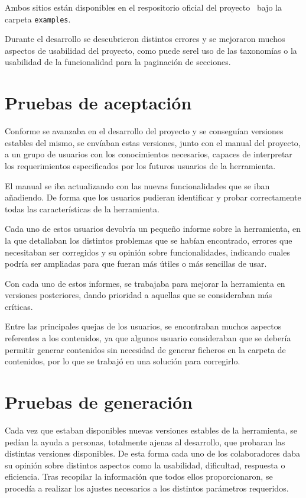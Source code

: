 Ambos sitios están disponibles en el respositorio oficial del proyecto~\cite{repositorio}
bajo la carpeta \texttt{examples}.

Durante el desarrollo se descubrieron distintos errores y se mejoraron muchos aspectos de usabilidad del proyecto, 
como puede serel uso de las taxonomías o la usabilidad de la funcionalidad para la paginación de secciones.

\section{Pruebas de aceptación}

Conforme se avanzaba en el desarrollo del proyecto y se conseguían versiones estables del mismo, se
envíaban estas versiones, junto con el manual del proyecto, a un grupo de usuarios con los conocimientos
necesarios, capaces de interpretar los requerimientos especificados por los futuros usuarios de la herramienta.

El manual se iba actualizando con las nuevas funcionalidades que se iban añadiendo. De forma que
los usuarios pudieran identificar y probar correctamente todas las características de la herramienta.

Cada uno de estos usuarios devolvía un pequeño informe sobre la herramienta, en la que detallaban los distintos
problemas que se habían encontrado, errores que necesitaban ser corregidos y su opinión sobre
funcionalidades, indicando cuales podría ser ampliadas para que fueran más útiles o más sencillas de usar.

Con cada uno de estos informes, se trabajaba para mejorar la herramienta en versiones posteriores, dando
prioridad a aquellas que se consideraban más críticas.

Entre las principales quejas de los usuarios, se encontraban muchos aspectos referentes a los contenidos,
ya que algunos usuario consideraban que se debería permitir generar contenidos sin necesidad 
de generar ficheros en la carpeta de contenidos, por lo que se trabajó en una solución para corregirlo.

\section{Pruebas de generación}

Cada vez que estaban disponibles nuevas versiones estables de la herramienta, se pedían la ayuda a personas,
totalmente ajenas al desarrollo, que probaran las distintas versiones disponibles. De esta forma cada uno
de los colaboradores daba su opinión sobre  distintos aspectos como la usabilidad, dificultad, respuesta o eficiencia.
Tras recopilar la información que todos ellos proporcionaron, se procedía a realizar los ajustes
necesarios a los distintos parámetros requeridos.


